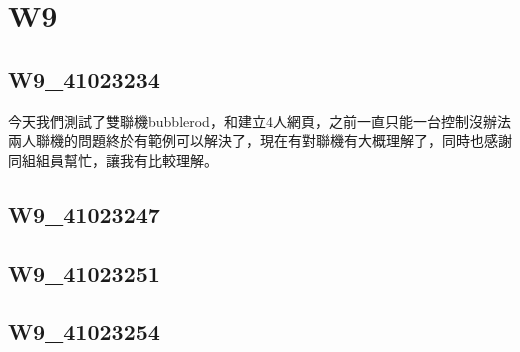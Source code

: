 \chapter{W9}
\section{W9_41023234}


今天我們測試了雙聯機bubblerod，和建立4人網頁，之前一直只能一台控制沒辦法兩人聯機的問題終於有範例可以解決了，現在有對聯機有大概理解了，同時也感謝同組組員幫忙，讓我有比較理解。\\



\section{W9_41023247}





\section{W9_41023251}





\section{W9_41023254}




